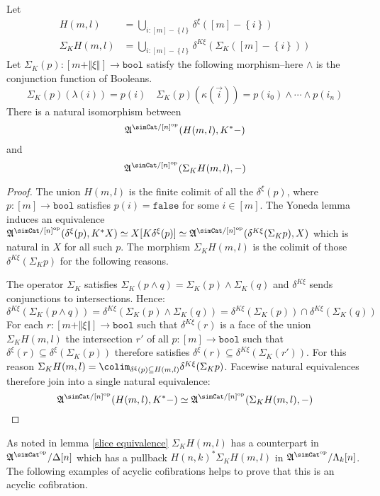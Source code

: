 \documentclass{tac}
\newcommand\set[1]{\left\{#1\right\}}
\newcommand\ri{^*}
\newcommand\dual{^{\mathrm{op}}}
\newcommand\s{^{\simCat\dual}}
\newcommand\of{:}
\newcommand\simplex\Delta
\newcommand\horn\Lambda
\newcommand\false{\mathtt{false}}
\newcommand\bool{\mathtt{bool}}
\newcommand\norm[1]{\Vert #1 \Vert}
\newcommand\ka\kappa
\newcommand\la\lambda
\newcommand\depsum{\Sigma_}
\newcommand\face\delta
\newcommand\ambient{\mathfrak A}
\begin{document}
\begin{proposition} Let
\begin{align*}
H(m,l)&=\bigcup_{i\of [m]-\set l} \face^\xi([m]-\set i)\\
\depsum KH(m,l)&=\bigcup_{i\of [m]-\set l} \face^{K\xi}(\depsum K([m]-\set i))
\end{align*}
Let $\depsum K(p)\of [m+\norm\xi]\to \bool$ satisfy the following morphism--here $\mathord\land$ is the conjunction function of Booleans.
\[ \depsum K(p)(\la(i))=p(i)\quad\depsum K(p)(\ka(\vec i)) = p(i_0)\land\dotsm\land p(i_n) \] 
There is a natural isomorphism between
\[ \ambient^{\simCat/[n]\dual}(H(m,l),K\ri -) \] and 
\[ \ambient^{\simCat/[n]\dual}(\depsum KH(m,l),-) \] \label{K-universal}
\end{proposition}


\begin{proof} The union $H(m,l)$ is the finite colimit of all the $\face^\xi(p)$, where $p\of[m]\to\bool$ satisfies $p(i)=\false$ for some $i\in [m]$. The Yoneda lemma induces an equivalence $\ambient^{\simCat/[n]\dual}(\face^\xi(p),K\ri X)\simeq X[K\face^\xi(p)]\simeq \ambient^{\simCat/[n]\dual}(\face^{K\xi}(\depsum K p),X)$ which is natural in $X$ for all such $p$. The morphism $\depsum KH(m,l)$ is the colimit of those $\face^{K\xi}(\depsum K p)$ for the following reasons.

The operator $\depsum K$ satisfies $\depsum K(p\land q)=\depsum K(p)\land \depsum K(q)$ and $\face^{K\xi}$ sends conjunctions to intersections. Hence:
\[ \face^{K\xi}(\depsum K(p\land q)) = \face^{K\xi}(\depsum K(p)\land \depsum K(q)) = \face^{K\xi}(\depsum K(p))\cap \face^{K\xi}(\depsum K(q)) \]
For each $r\of[m+\norm\xi]\to \bool$ such that $\face^{K\xi}(r)$ is a face of the union $\depsum KH(m,l)$ the intersection $r'$ of all $p\of[m]\to \bool$ such that $\face^\xi(r)\subseteq\face^\xi(\depsum K(p))$ therefore satisfies $\face^\xi(r)\subseteq \face^{K\xi}(\depsum K(r'))$. For this reason $\depsum KH(m,l)=\colim_{\face^\xi(p)\subseteq H(m,l)}\face^{K\xi}(\depsum K p)$. Facewise natural equivalences therefore join into a single natural equivalence:
\[ \ambient^{\simCat/[n]\dual}(H(m,l),K\ri -)\simeq\ambient^{\simCat/[n]\dual}(\depsum K H(m,l), -) \]
\end{proof}

As noted in lemma \ref{slice equivalence} $\depsum K H(m,l)$ has a counterpart in $\ambient\s/\simplex[n]$ which has a pullback $H(n,k)\ri \depsum K H(m,l)$ in $\ambient\s/\horn_k[n]$. The following examples of acyclic cofibrations helps to prove that this is an acyclic cofibration.
\end{document}
